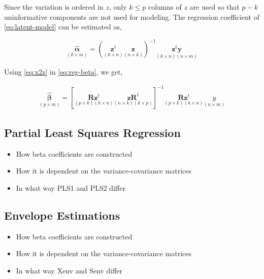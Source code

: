 \documentclass[12pt,3p,authoryear]{elsarticle}
\providecommand{\tightlist}{%
  \setlength{\itemsep}{0pt}\setlength{\parskip}{0pt}}
\begin{document}
Since the variation is ordered in \(z\), only \(k\le p\) columns of
\(z\) are used so that \(p-k\) uninformative components are not used for
modeling. The regression coefficient of \eqref{eq:latent-model} can be
estimated as,

\begin{equation}
\underset{(k\times m)}{\boldsymbol{\hat{\alpha}}} =
  \left(\underset{(k \times n)}{\mathbf{z}^t}
    \underset{(n \times k)}{\mathbf{z}}\right)^{-1}
  \underset{(k \times n)(n \times m)}{\mathbf{z}^t\mathbf{y}}
\label{eq:reg-alpha}
\end{equation}

Using \eqref{eq:x2z} in \eqref{eq:reg-beta}, we get,

\[
\begin{aligned}
\underset{(p\times m)}{\boldsymbol{\hat{\beta}}} =
  \left[
    \underset{(p\times k)(k \times n)}{\mathbf{R}\mathbf{z}^t}
    \underset{(n\times k)(k \times p)}{\mathbf{z} \mathbf{R}^t}
  \right]^{-1}
  \underset{(p\times k)(k \times n)}{\mathbf{R}\mathbf{z}^t}
  \underset{(n\times m)}{y}
\end{aligned}
\]

\subsection{Partial Least Squares
Regression}\label{partial-least-squares-regression}

\begin{itemize}
\tightlist
\item
  How beta coefficients are constructed
\item
  How it is dependent on the variance-covariance matrices
\item
  In what way PLS1 and PLS2 differ
\end{itemize}

\subsection{Envelope Estimations}\label{envelope-estimations}

\begin{itemize}
\tightlist
\item
  How beta coefficients are constructed
\item
  How it is dependent on the variance-covariance matrices
\item
  In what way Xenv and Senv differ
\end{itemize}
\end{document}

